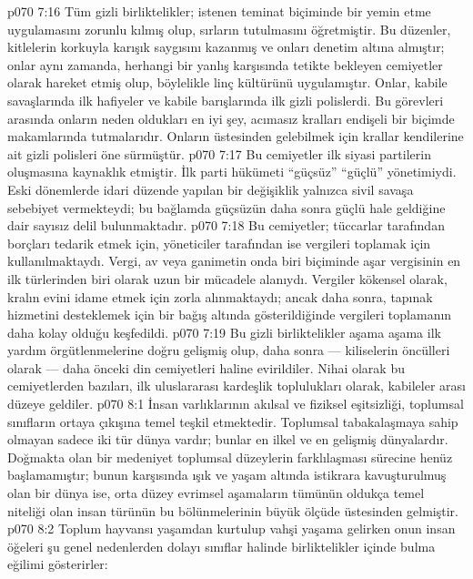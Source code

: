 \vs p070 7:16 Tüm gizli birliktelikler; istenen teminat biçiminde bir yemin etme uygulamasını zorunlu kılmış olup, sırların tutulmasını öğretmiştir. Bu düzenler, kitlelerin korkuyla karışık saygısını kazanmış ve onları denetim altına almıştır; onlar aynı zamanda, herhangi bir yanlış karşısında tetikte bekleyen cemiyetler olarak hareket etmiş olup, böylelikle linç kültürünü uygulamıştır. Onlar, kabile savaşlarında ilk hafiyeler ve kabile barışlarında ilk gizli polislerdi. Bu görevleri arasında onların neden oldukları en iyi şey, acımasız kralları endişeli bir biçimde makamlarında tutmalarıdır. Onların üstesinden gelebilmek için krallar kendilerine ait gizli polisleri öne sürmüştür.
\vs p070 7:17 Bu cemiyetler ilk siyasi partilerin oluşmasına kaynaklık etmiştir. İlk parti hükümeti “güçsüz”  “güçlü” yönetimiydi. Eski dönemlerde idari düzende yapılan bir değişiklik yalnızca sivil savaşa sebebiyet vermekteydi; bu bağlamda güçsüzün daha sonra güçlü hale geldiğine dair sayısız delil bulunmaktadır.
\vs p070 7:18 Bu cemiyetler; tüccarlar tarafından borçları tedarik etmek için, yöneticiler tarafından ise vergileri toplamak için kullanılmaktaydı. Vergi, av veya ganimetin onda biri biçiminde aşar vergisinin en ilk türlerinden biri olarak uzun bir mücadele alanıydı. Vergiler kökensel olarak, kralın evini idame etmek için zorla alınmaktaydı; ancak daha sonra, tapınak hizmetini desteklemek için bir bağış altında gösterildiğinde vergileri toplamanın daha kolay olduğu keşfedildi.
\vs p070 7:19 Bu gizli birliktelikler aşama aşama ilk yardım örgütlenmelerine doğru gelişmiş olup, daha sonra --- kiliselerin öncülleri olarak --- daha önceki din cemiyetleri haline evirildiler. Nihai olarak bu cemiyetlerden bazıları, ilk uluslararası kardeşlik toplulukları olarak, kabileler arası düzeye geldiler.
\vs p070 8:1 İnsan varlıklarının akılsal ve fiziksel eşitsizliği, toplumsal sınıfların ortaya çıkışına temel teşkil etmektedir. Toplumsal tabakalaşmaya sahip olmayan sadece iki tür dünya vardır; bunlar en ilkel ve en gelişmiş dünyalardır. Doğmakta olan bir medeniyet toplumsal düzeylerin farklılaşması sürecine henüz başlamamıştır; bunun karşısında ışık ve yaşam altında istikrara kavuşturulmuş olan bir dünya ise, orta düzey evrimsel aşamaların tümünün oldukça temel niteliği olan insan türünün bu bölünmelerinin büyük ölçüde üstesinden gelmiştir.
\vs p070 8:2 Toplum hayvansı yaşamdan kurtulup vahşi yaşama gelirken onun insan öğeleri şu genel nedenlerden dolayı sınıflar halinde birliktelikler içinde bulma eğilimi gösterirler:
